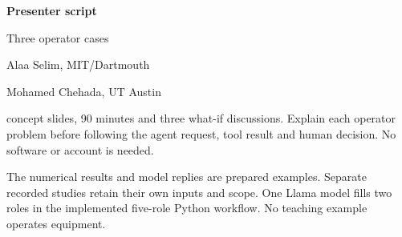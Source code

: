 \documentclass[12pt,letterpaper]{article}
\begin{document}
{\Huge\bfseries\color{IEEEBlue} Presenter script\par}
{\LARGE Three operator cases\par}\bigskip
{\large Alaa Selim, MIT/Dartmouth\par Mohamed Chehada, UT Austin\par} concept slides, 90 minutes and three what-if discussions. Explain each operator problem before following the agent request, tool result and human decision. No software or account is needed.\par\medskip
The numerical results and model replies are prepared examples. Separate recorded studies retain their own inputs and scope. One Llama model fills two roles in the implemented five-role Python workflow. No teaching example operates equipment.\par\medskip
\end{document}
